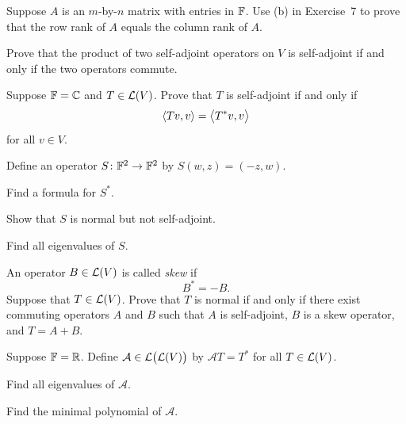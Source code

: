\begin{exc}
\begin{exercise}
Suppose $A$ is an $m$-by-$n$ matrix with entries in $\mathbb{F}$. Use (b) in
Exercise~7 to prove that the row rank of $A$ equals the column rank of $A$.
\end{exercise}

\begin{exercise}
Prove that the product of two self-adjoint operators on $V$ is self-adjoint if
and only if the two operators commute.
\end{exercise}

\begin{exercise}
Suppose $\mathbb{F}=\mathbb{C}$ and $T\in\mathcal{L}(V)$. Prove that $T$ is self-adjoint if and only
if
\[ \langle Tv, v \rangle = \bigl\langle T^*v,v\bigr\rangle \]
for all $v\in V$.
\end{exercise}

\begin{exercise}
Define an operator $S\colon\mathbb{F}^2\to\mathbb{F}^2$ by $S(w,z)=(-z,w)$.
\begin{parts}
\item Find a formula for $S^*$.
\item Show that $S$ is normal but not self-adjoint.
\item Find all eigenvalues of $S$.
\end{parts}
\end{exercise}

\begin{exercise}
An operator $B\in\mathcal{L}(V)$ is called \emph{skew} if
\[ B^* = -B. \]
Suppose that $T\in\mathcal{L}(V)$. Prove that $T$ is normal if and only if there exist
commuting operators $A$ and $B$ such that $A$ is self-adjoint, $B$ is a skew
operator, and $T=A+B$.
\end{exercise}

\begin{exercise}
Suppose $\mathbb{F}=\mathbb{R}$. Define $\mathcal{A}\in\mathcal{L}\bigl(\mathcal{L}(V)\bigr)$ by
$\mathcal{A}T=T^*$ for all $T\in\mathcal{L}(V)$.
\begin{parts}
\item Find all eigenvalues of $\mathcal{A}$.
\item Find the minimal polynomial of $\mathcal{A}$.
\end{parts}
\end{exercise}


\end{exc}
